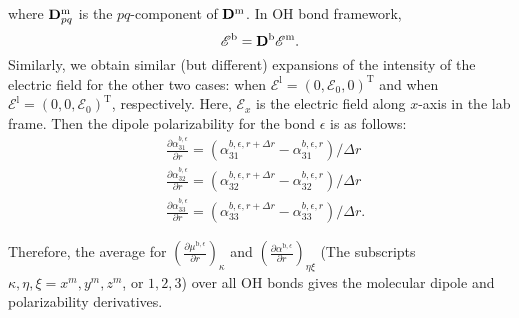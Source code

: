 where ${\bf D}^{\text{m}}_{pq}$ is the $pq$-component of ${\bf D}^\text{m}$.
%
In OH bond framework,  
\begin{equation}
  \mathscr{E}^{\text b} = {\bf D}^{\text b} \mathscr{E}^{\text{m}}.
\end{equation}
Similarly, we obtain similar (but different) expansions of the intensity of the electric field for the other two cases: 
when $\mathscr{E}^{\text{l}} = (0,\mathscr{E}_0, 0)^\text{T}$ and when $\mathscr{E}^{\text{l}} = (0,0,\mathscr{E}_0)^\text{T}$, respectively.
Here, $\mathscr{E}_x$ is the electric field along $x$-axis in the lab frame. 
    Then the dipole polarizability for the bond ${\epsilon}$ is as follows:
\begin{subequations}
  \begin{align}
    &\frac{\partial \alpha^{b,\epsilon}_{31}}{\partial r} = (\alpha^{b,\epsilon,r+\Delta r}_{31} -\alpha^{b,\epsilon,r}_{31})/\Delta r\\
    &\frac{\partial \alpha^{b,\epsilon}_{32}}{\partial r} = (\alpha^{b,\epsilon,r+\Delta r}_{32} -\alpha^{b,\epsilon,r}_{32})/\Delta r\\
    &\frac{\partial \alpha^{b,\epsilon}_{33}}{\partial r} = (\alpha^{b,\epsilon,r+\Delta r}_{33} -\alpha^{b,\epsilon,r}_{33})/\Delta r.
  \end{align}
\end{subequations}

Therefore, the average for $(\frac{\partial \mu^{\text{b},\epsilon}}{\partial r})_\kappa$ and $(\frac{\partial \alpha^{\text{b},\epsilon}}{\partial r})_{\eta\xi}$ 
(The subscripts $\kappa, \eta, \xi = x^m, y^m, z^m$, or $1, 2, 3$) over all OH bonds gives the molecular dipole and polarizability derivatives. 

